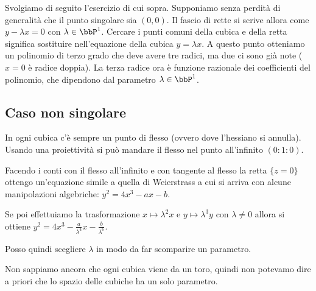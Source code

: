 Svolgiamo di seguito l'esercizio di cui sopra.
Supponiamo senza perdità di generalità che il punto singolare sia $(0,
0)$. Il fascio di rette si scrive allora come $y - \lambda x = 0$ con
$\lambda \in \bbP^1$. Cercare i punti comuni della cubica e della retta
significa sostituire nell'equazione della cubica $y = \lambda x$. A
questo punto otteniamo un polinomio di terzo grado che deve avere tre
radici, ma due ci sono già note ($x = 0$ è radice doppia). La terza
radice ora è funzione razionale dei coefficienti del polinomio, che
dipendono dal parametro $\lambda \in \bbP^1$.


\subsection{Caso non singolare}
In ogni cubica c'è sempre un punto di flesso (ovvero dove l'hessiano si
annulla). Usando una proiettività si può mandare il flesso nel punto
all'infinito $(0 : 1 : 0)$.


Facendo i conti con il flesso all'infinito e con tangente al flesso la
retta $\{ z = 0 \}$ ottengo un'equazione simile a quella di Weierstrass
a cui si arriva con alcune manipolazioni algebriche:
$y^2 = 4 x^3 - a x - b$.

Se poi effettuiamo la trasformazione $x \mapsto \lambda^2 x$ e $y
\mapsto \lambda^3 y$ con $\lambda \neq 0$ allora si ottiene $y^2 = 4 x^3
- \frac{a}{\lambda^4} x - \frac{b}{\lambda^6}$.

Posso quindi scegliere $\lambda$ in modo da far scomparire un parametro.

\begin{osservazione}
  Non sappiamo ancora che ogni cubica viene da un toro, quindi non
  potevamo dire a priori che lo spazio delle cubiche ha un solo
  parametro.
\end{osservazione}


